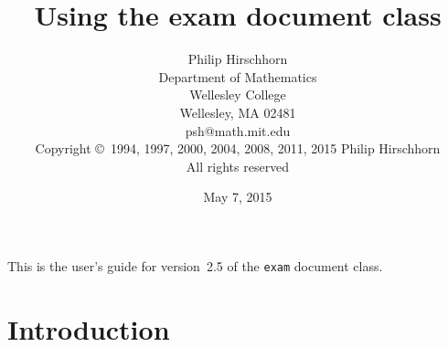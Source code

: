 \documentclass[12pt]{exam}
\newcommand{\docversion}{2.5}
\newcommand{\docdate}{May 7, 2015}
\begin{document}
\title{Using the exam document class}

\author{Philip Hirschhorn\\
  Department of Mathematics\\
  Wellesley College\\
  Wellesley, MA 02481\\
  psh@math.mit.edu\\[\bigskipamount]
  Copyright \copyright~1994, 1997, 2000, 2004, 2008, 2011, 2015 Philip
  Hirschhorn\\
  All rights reserved}

\date{\docdate}

\maketitle

\begin{center}
  \small
  This is the user's guide for version~\docversion{} of the
  \verb"exam" document class. 
\end{center}

\tableofcontents

\section{Introduction}
\end{document}
